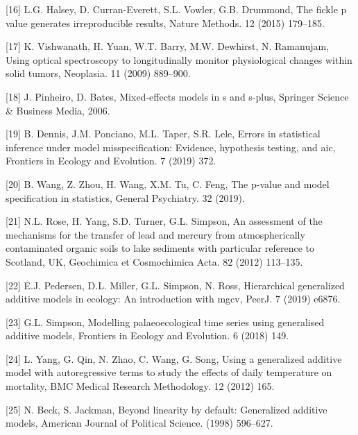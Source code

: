 \documentclass[
]{article}
\begin{document}
\leavevmode\hypertarget{ref-halsey2015}{}%
{[}16{]} L.G. Halsey, D. Curran-Everett, S.L. Vowler, G.B. Drummond, The fickle p value generates irreproducible results, Nature Methods. 12 (2015) 179--185.

\leavevmode\hypertarget{ref-vishwanath2009}{}%
{[}17{]} K. Vishwanath, H. Yuan, W.T. Barry, M.W. Dewhirst, N. Ramanujam, Using optical spectroscopy to longitudinally monitor physiological changes within solid tumors, Neoplasia. 11 (2009) 889--900.

\leavevmode\hypertarget{ref-pinheiro2006}{}%
{[}18{]} J. Pinheiro, D. Bates, Mixed-effects models in s and s-plus, Springer Science \& Business Media, 2006.

\leavevmode\hypertarget{ref-dennis2019}{}%
{[}19{]} B. Dennis, J.M. Ponciano, M.L. Taper, S.R. Lele, Errors in statistical inference under model misspecification: Evidence, hypothesis testing, and aic, Frontiers in Ecology and Evolution. 7 (2019) 372.

\leavevmode\hypertarget{ref-wang2019}{}%
{[}20{]} B. Wang, Z. Zhou, H. Wang, X.M. Tu, C. Feng, The p-value and model specification in statistics, General Psychiatry. 32 (2019).

\leavevmode\hypertarget{ref-rose2012}{}%
{[}21{]} N.L. Rose, H. Yang, S.D. Turner, G.L. Simpson, An assessment of the mechanisms for the transfer of lead and mercury from atmospherically contaminated organic soils to lake sediments with particular reference to Scotland, UK, Geochimica et Cosmochimica Acta. 82 (2012) 113--135.

\leavevmode\hypertarget{ref-pedersen2019}{}%
{[}22{]} E.J. Pedersen, D.L. Miller, G.L. Simpson, N. Ross, Hierarchical generalized additive models in ecology: An introduction with mgcv, PeerJ. 7 (2019) e6876.

\leavevmode\hypertarget{ref-simpson2018}{}%
{[}23{]} G.L. Simpson, Modelling palaeoecological time series using generalised additive models, Frontiers in Ecology and Evolution. 6 (2018) 149.

\leavevmode\hypertarget{ref-yang2012}{}%
{[}24{]} L. Yang, G. Qin, N. Zhao, C. Wang, G. Song, Using a generalized additive model with autoregressive terms to study the effects of daily temperature on mortality, BMC Medical Research Methodology. 12 (2012) 165.

\leavevmode\hypertarget{ref-beck1998}{}%
{[}25{]} N. Beck, S. Jackman, Beyond linearity by default: Generalized additive models, American Journal of Political Science. (1998) 596--627.
\end{document}
